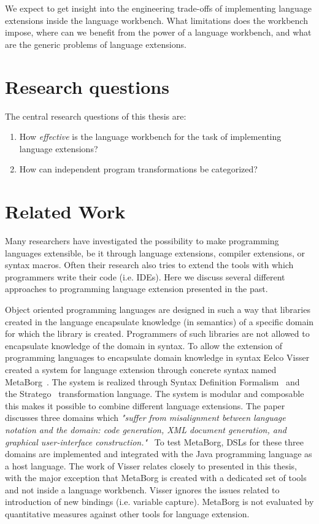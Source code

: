We expect to get insight into the engineering trade-offs of implementing language extensions inside the language workbench. What limitations does the workbench impose, where can we benefit from the power of a language workbench, and what are the generic problems of language extensions.

\section{Research questions}
The central research questions of this thesis are:

\begin{enumerate}
	\item How \textit{effective} is the language workbench for the task of implementing language extensions?
	\item How can independent program transformations be categorized?	
\end{enumerate}

\section{Related Work} \label{sec:related}
Many researchers have investigated the possibility to make programming languages extensible, be it through language extensions, compiler extensions, or syntax macros. Often their research also tries to extend the tools with which programmers write their code (i.e. IDEs). Here we discuss several different approaches to programming language extension presented in the past.

Object oriented programming languages are designed in such a way that libraries created in the language encapsulate knowledge (in semantics) of a specific domain for which the library is created. Programmers of such libraries are not allowed to encapsulate knowledge of the domain in syntax. To allow the extension of programming languages to encapsulate domain knowledge in syntax Eelco Visser created a system for language extension through concrete syntax named MetaBorg~\cite{Visser20024}. The system is realized through Syntax Definition Formalism~\cite{Heering1989} and the Stratego~\cite{Visser2001a} transformation language. The system is modular and composable this makes it possible to combine different language extensions. The paper discusses three domains which \textit{"suffer from misalignment between language notation and the domain: code generation, XML document generation, and graphical user-interface construction."}~\cite{Visser20024} To test MetaBorg, DSLs for these three domains are implemented and integrated with the Java programming language as a host language. The work of Visser relates closely to \projectname presented in this thesis, with the major exception that MetaBorg is created with a dedicated set of tools and not inside a language workbench. Visser ignores the issues related to introduction of new bindings (i.e. variable capture). MetaBorg is not evaluated by quantitative measures against other tools for language extension.

